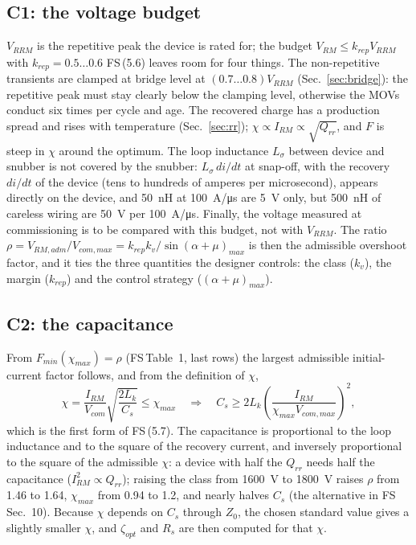 \documentclass[10pt,a4paper]{scrartcl}
\newcommand{\Lk}{L_{k}}
\newcommand{\VRRM}{V_{RRM}}
\newcommand{\fs}[1]{\textsf{FS}\,(#1)}
\newcommand{\fssec}[1]{\textsf{FS}\,Sec.~#1}
\newcommand{\fstab}[1]{\textsf{FS}\,Table~#1}
\begin{document}
\subsection{C1: the voltage budget}
$\VRRM$ is the repetitive peak the device is rated for; the budget $V_{RM}\le k_{rep}\VRRM$ with $k_{rep} = 0.5\ldots0.6$ \fs{5.6} leaves room for four things. The non-repetitive transients are clamped at bridge level at $(0.7\ldots0.8)\VRRM$ (Sec.~\ref{sec:bridge}): the repetitive peak must stay clearly below the clamping level, otherwise the MOVs conduct six times per cycle and age. The recovered charge has a production spread and rises with temperature (Sec.~\ref{sec:rr}); $\chi\propto I_{RM}\propto\sqrt{Q_{rr}}$, and $F$ is steep in $\chi$ around the optimum. The loop inductance $L_\sigma$ between device and snubber is not covered by the snubber: $L_\sigma\,di/dt$ at snap-off, with the recovery $di/dt$ of the device (tens to hundreds of amperes per microsecond), appears directly on the device, and \SI{50}{nH} at \SI{100}{A/\micro s} are \SI{5}{V} only, but \SI{500}{nH} of careless wiring are \SI{50}{V} per \SI{100}{A/\micro s}. Finally, the voltage measured at commissioning is to be compared with this budget, not with $\VRRM$. The ratio $\rho = V_{RM,adm}/V_{com,max} = k_{rep}k_v/\sin(\alpha+\mu)_{max}$ is then the admissible overshoot factor, and it ties the three quantities the designer controls: the class ($k_v$), the margin ($k_{rep}$) and the control strategy ($(\alpha+\mu)_{max}$).

\subsection{C2: the capacitance}\label{sec:C2}
From $F_{min}(\chi_{max}) = \rho$ (\fstab{1}, last rows) the largest admissible initial-current factor follows, and from the definition of $\chi$,
\begin{equation}
\chi = \frac{I_{RM}}{V_{com}}\sqrt{\frac{2\Lk}{C_s}} \le \chi_{max}
\quad\Rightarrow\quad
C_s \ge 2\Lk\left(\frac{I_{RM}}{\chi_{max}V_{com,max}}\right)^{2} ,
\label{eq:Csderiv}
\end{equation}
which is the first form of \fs{5.7}. The capacitance is proportional to the loop inductance and to the square of the recovery current, and inversely proportional to the square of the admissible $\chi$: a device with half the $Q_{rr}$ needs half the capacitance ($I_{RM}^2\propto Q_{rr}$); raising the class from \SI{1600}{V} to \SI{1800}{V} raises $\rho$ from 1.46 to 1.64, $\chi_{max}$ from 0.94 to 1.2, and nearly halves $C_s$ (the alternative in \fssec{10}). Because $\chi$ depends on $C_s$ through $Z_0$, the chosen standard value gives a slightly smaller $\chi$, and $\zeta_{opt}$ and $R_s$ are then computed for that $\chi$.
\end{document}
